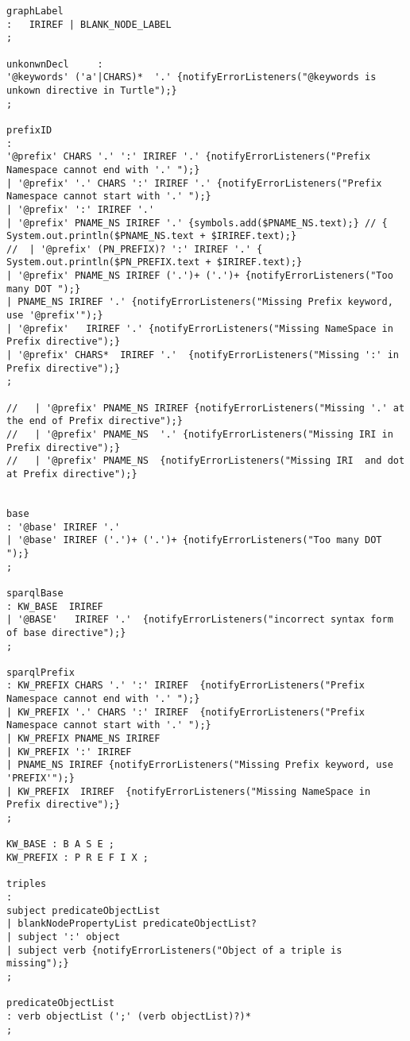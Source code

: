 \begin{appendices}
\begin{lstlisting}[breaklines,basicstyle=\ttfamily]
graphLabel
: 	IRIREF | BLANK_NODE_LABEL
;

unkonwnDecl 	:
'@keywords' ('a'|CHARS)*  '.' {notifyErrorListeners("@keywords is unkown directive in Turtle");}
;	

prefixID
:
'@prefix' CHARS '.' ':' IRIREF '.' {notifyErrorListeners("Prefix Namespace cannot end with '.' ");}
| '@prefix' '.' CHARS ':' IRIREF '.' {notifyErrorListeners("Prefix Namespace cannot start with '.' ");}
| '@prefix' ':' IRIREF '.' 
| '@prefix' PNAME_NS IRIREF '.' {symbols.add($PNAME_NS.text);} // { System.out.println($PNAME_NS.text + $IRIREF.text);} 
//  | '@prefix' (PN_PREFIX)? ':' IRIREF '.' { System.out.println($PN_PREFIX.text + $IRIREF.text);} 
| '@prefix' PNAME_NS IRIREF ('.')+ ('.')+ {notifyErrorListeners("Too many DOT ");}
| PNAME_NS IRIREF '.' {notifyErrorListeners("Missing Prefix keyword, use '@prefix'");}
| '@prefix'   IRIREF '.' {notifyErrorListeners("Missing NameSpace in Prefix directive");}
| '@prefix' CHARS*  IRIREF '.'  {notifyErrorListeners("Missing ':' in Prefix directive");}
;

//   | '@prefix' PNAME_NS IRIREF {notifyErrorListeners("Missing '.' at the end of Prefix directive");}
//   | '@prefix' PNAME_NS  '.' {notifyErrorListeners("Missing IRI in Prefix directive");}
//   | '@prefix' PNAME_NS  {notifyErrorListeners("Missing IRI  and dot at Prefix directive");}


base
: '@base' IRIREF '.'
| '@base' IRIREF ('.')+ ('.')+ {notifyErrorListeners("Too many DOT ");}
;

sparqlBase
: KW_BASE  IRIREF 
| '@BASE'   IRIREF '.'  {notifyErrorListeners("incorrect syntax form of base directive");}
;

sparqlPrefix
: KW_PREFIX CHARS '.' ':' IRIREF  {notifyErrorListeners("Prefix Namespace cannot end with '.' ");}
| KW_PREFIX '.' CHARS ':' IRIREF  {notifyErrorListeners("Prefix Namespace cannot start with '.' ");}
| KW_PREFIX PNAME_NS IRIREF
| KW_PREFIX ':' IRIREF
| PNAME_NS IRIREF {notifyErrorListeners("Missing Prefix keyword, use 'PREFIX'");}
| KW_PREFIX  IRIREF  {notifyErrorListeners("Missing NameSpace in Prefix directive");}
;

KW_BASE : B A S E ;
KW_PREFIX : P R E F I X ;

triples
:    
subject predicateObjectList
| blankNodePropertyList predicateObjectList?
| subject ':' object 
| subject verb {notifyErrorListeners("Object of a triple is missing");}
;

predicateObjectList
: verb objectList (';' (verb objectList)?)*
;


\end{lstlisting}
\end{appendices}

